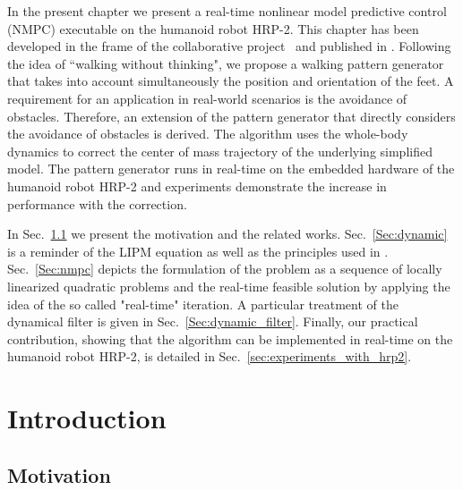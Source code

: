 
In the present chapter we present a real-time nonlinear model predictive control (NMPC) executable on the humanoid robot HRP-2.
This chapter has been developed in the frame of the collaborative project \koroibot\ and published in \cite{naveau:ral:2016}.
Following the idea of ``walking without thinking", we propose a walking pattern generator that takes into account simultaneously the position and orientation of the feet.
A requirement for an application in real-world scenarios is the avoidance of obstacles.
Therefore, an extension of the pattern generator that directly considers the avoidance of obstacles is derived.
The algorithm uses the whole-body dynamics to correct the center of mass trajectory of the underlying simplified model.
The pattern generator runs in real-time on the embedded hardware of the humanoid robot HRP-2 and experiments demonstrate the increase in performance with the correction.

In Sec.~\ref{Sec:nmpcmotivation} we present the motivation and the related works. Sec.~\ref{Sec:dynamic} is a reminder of the LIPM equation as well as the principles used in \cite{herdt:iros:2010}. Sec.~\ref{Sec:nmpc} depicts the formulation of the problem as a sequence of locally linearized quadratic problems and the real-time feasible solution by applying the idea of the so called "real-time" iteration.
A particular treatment of the dynamical filter is given in Sec.~\ref{Sec:dynamic_filter}.
Finally, our practical contribution, showing that the algorithm can be implemented in real-time on the humanoid robot HRP-2, is detailed in Sec.~\ref{sec:experiments_with_hrp2}.

\section{Introduction}

\subsection{Motivation}
\label{Sec:nmpcmotivation}

